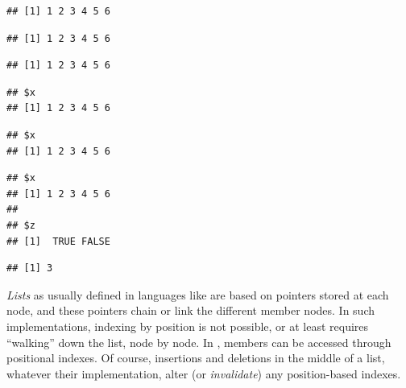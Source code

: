 \documentclass[krantz2]{krantz}\usepackage{knitr}%
\begin{document}
\begin{knitrout}\footnotesize
{}\color{fgcolor}\begin{kframe}
\begin{alltt}
\hlopt{$}
\end{alltt}
\begin{verbatim}
## [1] 1 2 3 4 5 6
\end{verbatim}
\begin{alltt}
\hlstd{a.list[[}\hlstd{]]}
\end{alltt}
\begin{verbatim}
## [1] 1 2 3 4 5 6
\end{verbatim}
\begin{alltt}
\hlstd{a.list[[}\hlstd{]]}
\end{alltt}
\begin{verbatim}
## [1] 1 2 3 4 5 6
\end{verbatim}
\begin{alltt}
\hlstd{a.list[}\hlstd{]}
\end{alltt}
\begin{verbatim}
## $x
## [1] 1 2 3 4 5 6
\end{verbatim}
\begin{alltt}
\hlstd{a.list[}\hlstd{]}
\end{alltt}
\begin{verbatim}
## $x
## [1] 1 2 3 4 5 6
\end{verbatim}
\begin{alltt}
\hlstd{a.list[}\hlstd{(}\hlstd{,}\hlstd{)]}
\end{alltt}
\begin{verbatim}
## $x
## [1] 1 2 3 4 5 6
## 
## $z
## [1]  TRUE FALSE
\end{verbatim}
\begin{alltt}
\hlstd{(a.list[[}\hlstd{(}\hlstd{,}\hlstd{)]])}
\end{alltt}
\begin{verbatim}
## [1] 3
\end{verbatim}
\end{kframe}
\end{knitrout}

\begin{explainbox}
\emph{Lists} as usually defined in languages like \Clang are based on pointers stored at each node, and these pointers chain or link the different member nodes. In such implementations, indexing by position is not possible, or at least requires ``walking'' down the list, node by node. In \Rlang,  members can be accessed through positional indexes. Of course, insertions and deletions in the middle of a list, whatever their implementation, alter (or \emph{invalidate}) any position-based indexes.
\end{explainbox}
\end{document}
